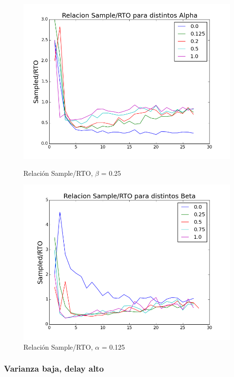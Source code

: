 \begin{figure}[H]
\begin{minipage}{0.5\linewidth}
\includegraphics[width=\linewidth]{../graficos/alphad01var5drop0.png}
\caption{Relación Sample/RTO, $\beta$ = 0.25}\label{fig:alpha-var5-drop0}
\end{minipage}
\hfill
\begin{minipage}{0.5\linewidth}
\includegraphics[width=\linewidth]{../graficos/betad01var5drop0.png}
\caption{Relación Sample/RTO, $\alpha$ = 0.125}\label{fig:beta-var5-drop0}
\end{minipage}
\end{figure}

\subsubsection{Varianza baja, delay alto}

